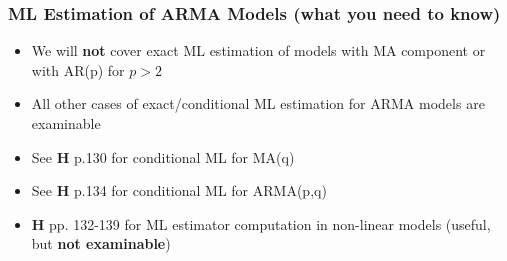 \documentclass{beamer}
\begin{document}
		\begin{frame}
		\frametitle{ML Estimation of ARMA Models (what you need to know)}
		\begin{itemize}
			\item[] We will \textbf{not} cover exact ML estimation of models with MA component or with  AR(p) for $p>2$
			\pause\vspace{15pt}
			\item[] All other cases of exact/conditional ML estimation for ARMA models are examinable
			\pause\vspace{15pt}
			\item[] See \textbf{H} p.130 for conditional ML for MA(q)
			\pause\vspace{15pt}
			\item[]  See \textbf{H} p.134 for conditional ML for ARMA(p,q)
			\pause\vspace{15pt}
			\item[]  \textbf{H} pp. 132-139 for  ML estimator computation in non-linear models (useful, but \textbf{not examinable})
			
				\end{itemize}
		\end{frame}
	
\end{document}
